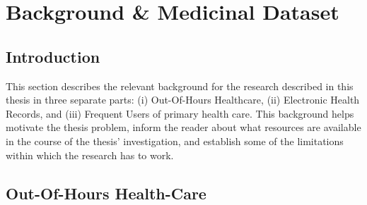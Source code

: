 \chapter{Background \& Medicinal Dataset}
\label{chpt:background}


\section{Introduction}


This section describes the relevant background for the research described in this thesis in three separate parts: (i) Out-Of-Hours Healthcare, (ii) Electronic Health Records, and (iii) Frequent Users of primary health care. This background helps motivate the thesis problem, inform the reader about what resources are available in the course of the thesis' investigation, and establish some of the limitations within which the research has to work. 


\section{Out-Of-Hours Health-Care}
\label{Out-Of-Hours_Health-Care}


